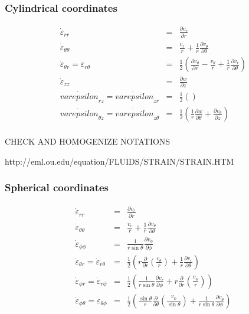 \subsubsection{Cylindrical coordinates}

\begin{eqnarray}
\dot\varepsilon_{rr} &=& \frac{\partial v_r}{\partial r} \\
\dot\varepsilon_{\theta\theta} &=& \frac{v_r}{r} + \frac{1}{r} \frac{\partial v_\theta}{\partial \theta}  \\
\dot\varepsilon_{\theta r} =
\dot\varepsilon_{r\theta} &=& \frac{1}{2} \left(   \frac{\partial v_\theta}{\partial r} - \frac{v_\theta}{r} 
+\frac{1}{r} \frac{\partial v_r}{\partial \theta}  \right)\\
\dot\varepsilon_{zz} &=& \frac{\partial w}{\partial z} \\
\dot{varepsilon}_{rz} = \dot{varepsilon}_{zr} &=& \frac{1}{2}\left(   \right) \\
\dot{varepsilon}_{\theta z} = \dot{varepsilon}_{z \theta} &=& \frac{1}{2}\left( \frac{1}{r} \frac{\partial w}{\partial \theta} + \frac{\partial v_\theta}{\partial z}  \right) \\
\end{eqnarray}
 
CHECK AND HOMOGENIZE NOTATIONS



http://eml.ou.edu/equation/FLUIDS/STRAIN/STRAIN.HTM

\subsubsection{Spherical coordinates}

\begin{eqnarray}
\dot\varepsilon_{rr} &=& \frac{\partial v_r}{\partial r} \\
\dot\varepsilon_{\theta\theta} &=& \frac{v_r}{r} + \frac{1}{r} \frac{\partial v_\theta}{\partial \theta}  \\
\dot\varepsilon_{\phi\phi} &=& \frac{1}{r \sin\theta} \frac{\partial v_\phi}{\partial \phi} \\
\dot\varepsilon_{\theta r} =
\dot\varepsilon_{r\theta}   &=& \frac{1}{2} \left( r \frac{\partial}{\partial r} (\frac{v_\theta}{r} ) 
+\frac{1}{r} \frac{\partial v_r}{\partial \theta} \right) \\
\dot\varepsilon_{\phi r} =
\dot\varepsilon_{r\phi}      &=&  \frac{1}{2} \left(  \frac{1}{r \sin\theta} \frac{\partial v_r}{\partial \phi} 
+ r \frac{\partial }{\partial r} (\frac{v_\phi}{r}) \right)  \\
\dot\varepsilon_{\phi \theta} =
\dot\varepsilon_{\theta\phi} &=& \frac{1}{2} \left( \frac{\sin \theta}{r} \frac{\partial }{\partial \theta} (\frac{v_\phi}{\sin\theta}) + \frac{1}{r \sin\theta} \frac{\partial v_\theta}{\partial \phi}    \right) 
\end{eqnarray}



